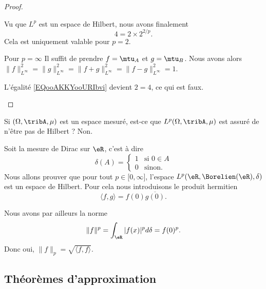 \begin{proof}
\begin{subproof}
    Vu que \( L^p\) est un espace de Hilbert, nous avons finalement 
    \begin{equation}
        4=2\times 2^{2/p}.
    \end{equation}
    Cela est uniquement valable pour \( p=2\).
\item[Pour \( p=\infty\)]
    Il suffit de prendre \( f=\mtu_A\) et \( g=\mtu_B\). Nous avons alors \(  \| f \|_{L^{\infty}}^2= \| g \|_{L^{\infty}}^2  =  \| f+g \|_{L^{\infty}}^2=\| f-g \|_{L^{\infty}}^2=1\).

    L'égalité \eqref{EQooAKKYooURIbvi} devient \( 2=4\), ce qui est faux.
    \end{subproof}
\end{proof}

Si \( (\Omega,\tribA,\mu)\) est un espace mesuré, est-ce que \( L^p(\Omega,\tribA,\mu)\) est assuré de n'être pas de Hilbert ? Non.

\begin{example}
    Soit la mesure de Dirac sur \( \eR\), c'est à dire
    \begin{equation}
        \delta(A)=\begin{cases}
            1    &   \text{si } 0\in A\\
            0    &    \text{sinon. }
        \end{cases}
    \end{equation}
    Nous allons prouver que pour tout \( p\in \mathopen[ 0 , \infty \mathclose]\), l'espace \( L^p(\eR,\Borelien(\eR),\delta)\) est un espace de Hilbert. Pour cela nous introduisons le produit hermitien
    \begin{equation}
        \langle f, g\rangle =f(0)\overline{ g(0) }.
    \end{equation}
    
    Nous avons par ailleurs la norme
    \begin{equation}
        \| f \|^p=\int_{\eR}| f(x) |^pd\delta=f(0)^p.
    \end{equation}
    Donc oui, \( \| f \|_p=\sqrt{ \langle f, f\rangle  }\).
\end{example}

\subsection{Théorèmes d'approximation}

